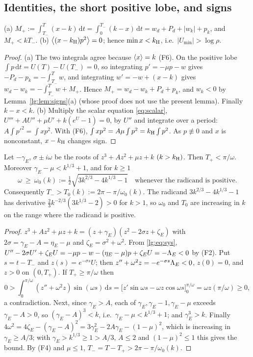 \subsection{Identities, the short positive lobe, and signs}\label{lg:sec:identities}
\begin{lemma}[Identities]\label{lg:lem:id}
\textup{(a)} $M_+:=\int_{T_-}^{T}(x-k)\,\mathrm dt=\int_0^{T_-}(k-x)\,\mathrm dt=w_d+P_d+|w_k|+p_k$, and
$M_+<kT_-$.
\textup{(b)} $\left\langle (x-k_{\mathrm H})p^2\right\rangle=0$; hence $\min x<k_{\mathrm H}$, i.e.\ $|U_{\min}|>\log\rho$.
\end{lemma}
\begin{proof}
(a) The two integrals agree because $\left\langle x\right\rangle=k$ (F6). On the positive lobe $\int p\,\mathrm dt=U(T)-U(T_-)=0$,
so integrating $p'=-\mu p-w$ gives $-P_d-p_k=-\int_{T_-}^Tw$, and integrating $w'=-w+(x-k)$ gives
$w_d-w_k=-\int_{T_-}^Tw+M_+$. Hence $M_+=w_d-w_k+P_d+p_k$, and $w_k<0$ by Lemma~\ref{lg:lem:signs}(a)
(whose proof does not use the present lemma). Finally $k-x<k$.
(b) Multiply the scalar equation \eqref{eq:scalar}, $U'''+AU''+\mu U'+k(e^U-1)=0$, by $U''$ and integrate over a period:
$A\int p'^2=\int xp^2$. With (F6), $\int xp^2=A\mu\int p^2=k_{\mathrm H}\int p^2$. As $p\not\equiv0$ and $x$ is
nonconstant, $x-k_{\mathrm H}$ changes sign.
\end{proof}

\begin{lemma}\label{lem:lgshortlobe}
Let $-\gamma_E$, $\sigma\pm i\omega$ be the roots of $z^3+Az^2+\mu z+k$ $(k>k_{\mathrm H})$. Then
$T_+<\pi/\omega$. Moreover $\gamma_E-\mu<k^{1/3}+1$, and for $k\ge1$
\[
\omega\ \ge\ \omega_0(k):=\tfrac12\sqrt{3k^{2/3}-4k^{1/3}-1}\quad\text{whenever the radicand is positive.}
\]
Consequently $T_->T_0(k):=2\pi-\pi/\omega_0(k)$. The radicand $3k^{2/3}-4k^{1/3}-1$ has derivative $\frac23 k^{-2/3}(3k^{1/3}-2)>0$ for $k>1$, so $\omega_0$ and $T_0$ are increasing in $k$ on the range where the radicand is positive.
\end{lemma}
\begin{proof}
$z^3+Az^2+\mu z+k=(z+\gamma_E)(z^2-2\sigma z+\zeta_E)$ with $2\sigma=\gamma_E-A=\eta_E-\mu$ and
$\zeta_E=\sigma^2+\omega^2$. From \eqref{lg:eq:sys},
$U''-2\sigma U'+\zeta_EU=-\mu p-w-(\eta_E-\mu)p+\zeta_EU=-\Lambda_E<0$ by (F2).
Put $s=t-T_-$ and $z(s)=e^{-\sigma s}U$; then $z''+\omega^2z=-e^{-\sigma s}\Lambda_E<0$,
$z(0)=0$, and $z>0$ on $(0,T_+)$. If $T_+\ge\pi/\omega$ then
\[
0>\int_0^{\pi/\omega}(z''+\omega^2z)\sin(\omega s)\,\mathrm ds
=\bigl[z'\sin\omega s-\omega z\cos\omega s\bigr]_0^{\pi/\omega}=\omega z(\pi/\omega)\ge0,
\]
a contradiction. Next, since $\gamma_E>A$, each of $\gamma_E,\gamma_E-1,\gamma_E-\mu$ exceeds $\gamma_E-A>0$, so
$(\gamma_E-A)^3<k$, i.e.\ $\gamma_E-\mu<k^{1/3}+1$; and $\gamma_E^3>k$. Finally
$4\omega^2=4\zeta_E-(\gamma_E-A)^2=3\gamma_E^2-2A\gamma_E-(1-\mu)^2$, which is increasing in
$\gamma_E\ge A/3$; with $\gamma_E>k^{1/3}\ge1>A/3$, $A\le2$ and $(1-\mu)^2\le1$ this gives the bound.
By (F4) and $\mu\le1$, $T_-=T-T_+>2\pi-\pi/\omega_0(k)$.
\end{proof}

